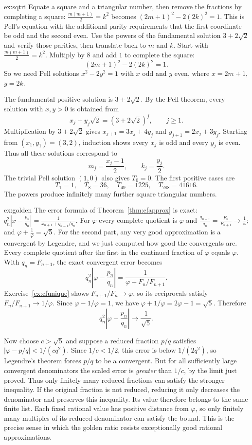 \begin{solution}{ex:sqtri}
\idea Equate a square and a triangular number, then remove the fractions by completing a square: $\frac{m(m+1)}2=k^2$ becomes $(2m+1)^2-2(2k)^2=1$. This is Pell's equation with the additional parity requirements that the first coordinate be odd and the second even. Use the powers of the fundamental solution $3+2\sqrt2$ and verify those parities, then translate back to $m$ and $k$.
\writeup Start with $\frac{m(m+1)}2=k^2$. Multiply by $8$ and add $1$ to complete the square:
\[
(2m+1)^2-2(2k)^2=1.
\]
So we need Pell solutions $x^2-2y^2=1$ with $x$ odd and $y$ even, where $x=2m+1$, $y=2k$.

The fundamental positive solution is $3+2\sqrt2$. By the Pell theorem, every solution with $x,y>0$ is obtained from
\[
x_j+y_j\sqrt2=(3+2\sqrt2)^j,\qquad j\ge1.
\]
Multiplication by $3+2\sqrt2$ gives
$x_{j+1}=3x_j+4y_j$ and $y_{j+1}=2x_j+3y_j$. Starting from $(x_1,y_1)=(3,2)$, induction shows every $x_j$ is odd and every $y_j$ is even. Thus all these solutions correspond to
\[
m_j=\frac{x_j-1}{2},\qquad k_j=\frac{y_j}{2}.
\]
The trivial Pell solution $(1,0)$ also gives $T_0=0$. The first positive cases are
\[
T_1=1,\quad T_8=36,\quad T_{49}=1225,\quad
T_{288}=41616.
\]
The powers produce infinitely many further square triangular numbers.
\end{solution}

\begin{solution}{ex:golden}
\idea The error formula of Theorem~\ref{thm:cfapprox} is exact: $q_n^2\left|x-\frac{p_n}{q_n}\right|=\frac1{x_{n+1}+q_{n-1}/q_n}$. For $\varphi$ every complete quotient is $\varphi$ and $\frac{q_{n-1}}{q_n}=\frac{F_n}{F_{n+1}}\to\frac1\varphi$; and $\varphi+\frac1\varphi=\sqrt5$. For the second part, any very good approximation is a convergent by Legendre, and we just computed how good the convergents are.
\writeup Every complete quotient after the first in the continued fraction of $\varphi$ equals $\varphi$. With $q_n=F_{n+1}$, the exact convergent error becomes
\[
q_n^2\left|\varphi-\frac{p_n}{q_n}\right|
=\frac1{\varphi+F_n/F_{n+1}}.
\]
Exercise~\ref{ex:cfunique} shows $F_{n+1}/F_n\to\varphi$, so its reciprocals satisfy $F_n/F_{n+1}\to1/\varphi$. Since $\varphi-1/\varphi=1$, we have $\varphi+1/\varphi=2\varphi-1=\sqrt5$. Therefore
\[
q_n^2\left|\varphi-\frac{p_n}{q_n}\right|
\longrightarrow\frac1{\sqrt5}.
\]

Now choose $c>\sqrt5$ and suppose a reduced fraction $p/q$ satisfies
$|\varphi-p/q|<1/(cq^2)$. Since $1/c<1/2$, this error is below $1/(2q^2)$, so Legendre's theorem forces $p/q$ to be a convergent. But for all sufficiently large convergent denominators the scaled error is \emph{greater} than $1/c$, by the limit just proved. Thus only finitely many reduced fractions can satisfy the stronger inequality. If the original fraction is not reduced, reducing it only decreases the denominator and preserves this inequality. Its value therefore belongs to the same finite list. Each fixed rational value has positive distance from $\varphi$, so only finitely many multiples of its reduced denominator can satisfy the bound. This is the precise sense in which the golden ratio resists exceptionally good rational approximations.
\end{solution}

